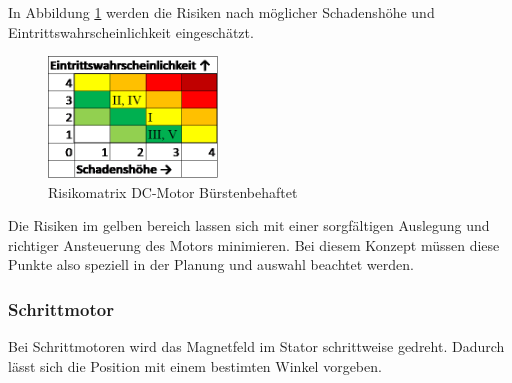 \documentclass[../../main.tex]{subfiles}
\begin{document}
    In Abbildung \ref{fig:antr_risikomatrix_buerstenbehaftet} werden die Risiken nach möglicher Schadenshöhe und Eintrittswahrscheinlichkeit eingeschätzt.

    \begin{figure}[H]
        \centering
        \includegraphics[width=0.4\textwidth]{Antr_Risiko_DCMotor_Buerstenbehaftet.png}
        \caption {Risikomatrix DC-Motor Bürstenbehaftet}
        \label{fig:antr_risikomatrix_buerstenbehaftet}
    \end{figure}

    Die Risiken im gelben bereich lassen sich mit einer sorgfältigen Auslegung und richtiger Ansteuerung des Motors minimieren. Bei diesem Konzept müssen diese Punkte also speziell in der Planung und auswahl beachtet werden. 

    \subsubsection{Schrittmotor}
    Bei Schrittmotoren wird das Magnetfeld im Stator schrittweise gedreht. Dadurch lässt sich die Position mit einem bestimten Winkel vorgeben.
\end{document}
